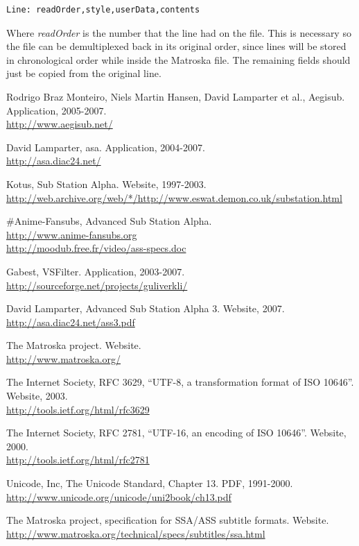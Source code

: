 \documentclass{spec}
\begin{document}
\begin{verbatim}
Line: readOrder,style,userData,contents
\end{verbatim}

Where \emph{readOrder} is the number that the line had on the file. This is necessary so the file
can be demultiplexed back in its original order, since lines will be stored in chronological order
while inside the Matroska file. The remaining fields should just be copied from the original line.


\newpage
{}
\begin{thebibliography}{1}

 Rodrigo Braz Monteiro, Niels Martin Hansen, David Lamparter et al., Aegisub. Application, 2005-2007.\\
\url{http://www.aegisub.net/}

 David Lamparter, asa. Application, 2004-2007.\\
\url{http://asa.diac24.net/}

 Kotus, Sub Station Alpha. Website, 1997-2003.\\
\url{http://web.archive.org/web/*/http://www.eswat.demon.co.uk/substation.html}

 \#Anime-Fansubs, Advanced Sub Station Alpha.\\
\url{http://www.anime-fansubs.org}\\
\url{http://moodub.free.fr/video/ass-specs.doc}

 Gabest, VSFilter. Application, 2003-2007.\\
\url{http://sourceforge.net/projects/guliverkli/}

 David Lamparter, Advanced Sub Station Alpha 3. Website, 2007.\\
\url{http://asa.diac24.net/ass3.pdf}

 The Matroska project. Website.\\
\url{http://www.matroska.org/}

 The Internet Society, RFC 3629, ``UTF-8, a transformation format of ISO 10646''. Website, 2003.\\
\url{http://tools.ietf.org/html/rfc3629}

 The Internet Society, RFC 2781, ``UTF-16, an encoding of ISO 10646''. Website, 2000.\\
\url{http://tools.ietf.org/html/rfc2781}

 Unicode, Inc, The Unicode Standard, Chapter 13. PDF, 1991-2000.\\
\url{http://www.unicode.org/unicode/uni2book/ch13.pdf}

 The Matroska project, specification for SSA/ASS subtitle formats. Website.\\
\url{http://www.matroska.org/technical/specs/subtitles/ssa.html}

\end{thebibliography}
\end{document}
